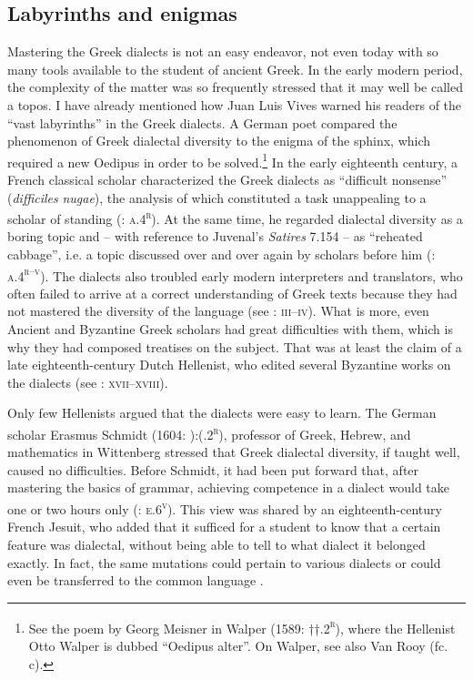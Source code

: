 \subsection{Labyrinths and enigmas}
\hypertarget{Toc19704824}{}
Mastering the Greek dialects is not an easy endeavor, not even today with so many tools available to the student of ancient Greek. In the early modern period, the complexity of the matter was so frequently stressed that it may well be called a topos. I have already mentioned how Juan Luis Vives warned his readers of the “vast labyrinths” in the Greek dialects. A German poet compared the phenomenon of Greek dialectal diversity to the enigma of the sphinx, which required a new Oedipus in order to be solved.\footnote{See the poem by Georg Meisner in Walper (1589: ††.2\textsc{\textsuperscript{r}}), where the Hellenist Otto Walper is dubbed “Oedipus alter”. On Walper, see also Van Rooy (fc. c).} In the early eighteenth century, a French classical scholar characterized the Greek dialects as “difficult nonsense” (\textit{difficiles} \textit{nugae}), the analysis of which constituted a task unappealing to a scholar of standing (\citealt{Maittaire1706}: \textsc{a.4}\textsc{\textsuperscript{r}}). At the same time, he regarded dialectal diversity as a boring topic and – with reference to Juvenal’s \textit{Satires} 7.154 – as “reheated cabbage”, i.e. a topic discussed over and over again by scholars before him (\citealt{Maittaire1706}: \textsc{a.4}\textsc{\textsuperscript{r–v}}). The dialects also troubled early modern interpreters and translators, who often failed to arrive at a correct understanding of Greek texts because they had not mastered the diversity of the language (see \citealt{Facius1782}: \textsc{iii–iv}). What is more, even Ancient and Byzantine Greek scholars had great difficulties with them, which is why they had composed treatises on the subject. That was at least the claim of a late eighteenth-century Dutch Hellenist, who edited several Byzantine works on the dialects (see \citealt{Koen1766}: \textsc{xvii–xviii}).

Only few Hellenists argued that the dialects were easy to learn. The German scholar Erasmus Schmidt (1604: ):(.2\textsc{\textsuperscript{r}}), professor of Greek, Hebrew, and mathematics in Wittenberg stressed that Greek dialectal diversity, if taught well, caused no difficulties. Before Schmidt, it had been put forward that, after mastering the basics of grammar, achieving competence in a dialect would take one or two hours only (\citealt{Caselius1560}: \textsc{e.6}\textsc{\textsuperscript{v}}). This view was shared by an eighteenth-century French Jesuit, who added that it sufficed for a student to know that a certain feature was dialectal, without being able to tell to what dialect it belonged exactly. In fact, the same mutations could pertain to various dialects or could even be transferred to the common language \citep[101]{Giraudeau1739}.

